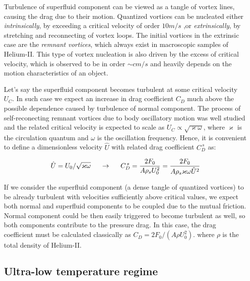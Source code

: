 Turbulence of superfluid component can be viewed as a tangle of vortex lines, causing the drag due to their motion. Quantized vortices can be nucleated either \textit{intrinsically}, by exceeding a critical velocity of order $10 \unit{m/s}$ ,or \textit{extrinsically}, by stretching and reconnecting of vortex loops. The initial vortices in the extrinsic case are the \textit{remnant vortices}, which always exist in macroscopic samples of Helium-II. This type of vortex nucleation is also driven by the excess of critical velocity, which is observed to be in order $\sim\unit{cm/s}$ and heavily depends on the motion characteristics of an object.

Let's say the superfluid component becomes turbulent at some critical velocity $U_C$. In such case we expect an increase in drag coefficient $C_D$ much above the possible dependence caused by turbulence of normal component. The process of self-reconecting remnant vortices due to body oscillatory motion was well studied \cite{universal_scaling} and the related critical velocity is expected to scale as $U_C \propto \sqrt{\varkappa \omega}$, where $\varkappa$ is the circulation quantum and $\omega$ is the oscillation frequency. Hence, it is convenient to define a dimensionless velocity $\hat{U}$ with related drag coefficient $C_D^{\,s}$ as:

\begin{equation}
\hat{U} = U_0 / \sqrt{\varkappa \omega}
\hspace{5mm}
\rightarrow
\hspace{5mm}
C_D^{\,s} = \frac{2 F_0}{A \rho_s U_0^2} = \frac{2 F_0}{A \rho_s \varkappa \omega \hat{U}^2}
\label{drag_super}
\end{equation}

If we consider the superfluid component (a dense tangle of quantized vortices) to be already turbulent with velocities sufficiently above critical values, we expect both normal and superfluid components to be coupled due to the mutual friction. Normal component could be then easily triggered to become turbulent as well, so both components contribute to the pressure drag. In this case, the drag coefficient must be calculated classically as $C_D = 2F_0 / (A\rho U_0^2)$. where $\rho$ is the total density of Helium-II.

\newpage

\subsection*{Ultra-low temperature regime}

